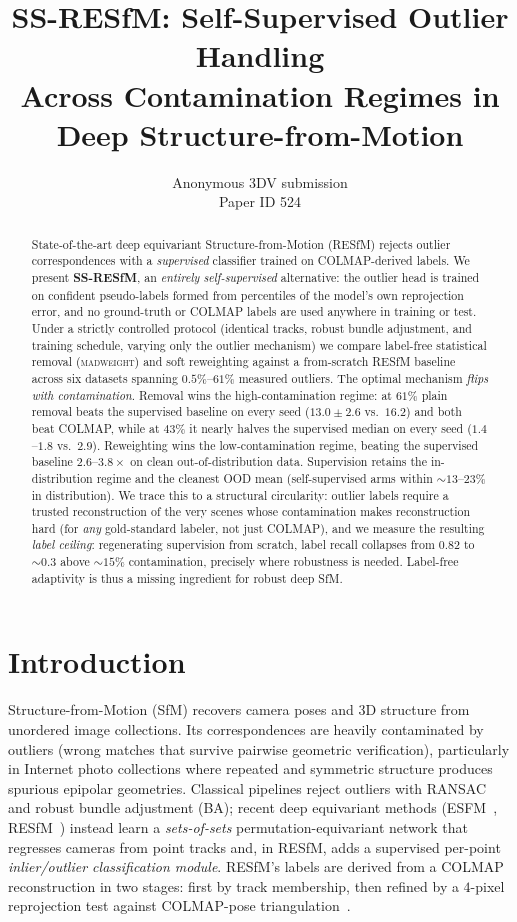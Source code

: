 \documentclass[10pt,twocolumn,letterpaper]{article}
\title{SS-RESfM: Self-Supervised Outlier Handling\\
Across Contamination Regimes in Deep Structure-from-Motion}
\author{Anonymous 3DV submission\\ Paper ID 524}
\newcommand{\mad}{\textsc{madweight}}
\begin{document}
\maketitle

\begin{abstract}
State-of-the-art deep equivariant Structure-from-Motion (RESfM) rejects outlier
correspondences with a \emph{supervised} classifier trained on COLMAP-derived labels. We
present \textbf{SS-RESfM}, an \emph{entirely self-supervised} alternative: the outlier
head is trained on confident pseudo-labels formed from percentiles of the model's own
reprojection error, and no ground-truth or COLMAP labels are used anywhere in training or
test. Under a strictly controlled protocol (identical tracks, robust bundle adjustment,
and training schedule, varying only the outlier mechanism) we compare label-free
statistical removal (\mad{}) and soft reweighting against a from-scratch RESfM baseline
across six datasets spanning $0.5\%$--$61\%$ measured outliers. The optimal mechanism
\emph{flips with contamination}. Removal wins the high-contamination regime: at $61\%$
plain removal beats the supervised baseline on every seed ($13.0\pm2.6$ vs.\
$16.2$) and both beat COLMAP, while at $43\%$ it nearly halves the supervised median
on every seed ($1.4$--$1.8$ vs.\ $2.9$). Reweighting wins the low-contamination regime, beating
the supervised baseline $2.6$--$3.8\times$ on clean out-of-distribution data. Supervision
retains the in-distribution regime and the cleanest OOD mean (self-supervised arms within
$\sim\!13$--$23\%$ in distribution). We trace this to a structural circularity: outlier labels
require a trusted reconstruction of the very scenes whose contamination makes
reconstruction hard (for \emph{any} gold-standard labeler, not just COLMAP), and we
measure the resulting \emph{label ceiling}: regenerating supervision from scratch, label
recall collapses from $0.82$ to $\sim\!0.3$ above $\sim\!15\%$ contamination, precisely
where robustness is needed. Label-free adaptivity is thus a missing ingredient for robust
deep SfM.
\end{abstract}

\section{Introduction}
Structure-from-Motion (SfM) recovers camera poses and 3D structure from unordered image
collections. Its correspondences are heavily contaminated by outliers (wrong matches
that survive pairwise geometric verification), particularly in Internet photo collections
where repeated and symmetric structure produces spurious epipolar geometries. Classical
pipelines reject outliers with RANSAC and robust bundle adjustment (BA); recent deep
equivariant methods (ESFM~\cite{esfm}, RESfM~\cite{resfm}) instead learn a
\emph{sets-of-sets} permutation-equivariant network that regresses cameras from point
tracks and, in RESfM, adds a supervised per-point \emph{inlier/outlier classification
module}. RESfM's labels are derived from a COLMAP~\cite{colmap} reconstruction in two
stages: first by track membership, then refined by a $4$-pixel reprojection test against
COLMAP-pose triangulation~\cite{resfm}.
\end{document}
